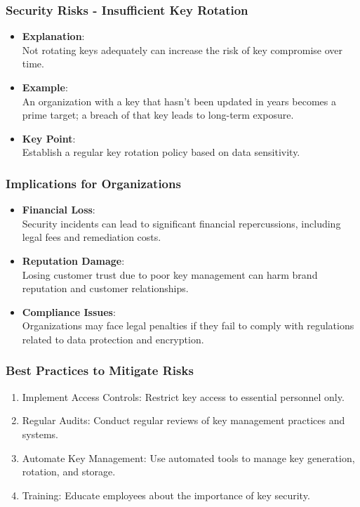 \documentclass{beamer}
\begin{document}
\begin{frame}[fragile]
    \frametitle{Security Risks - Insufficient Key Rotation}
    \begin{itemize}
        \item \textbf{Explanation}:
        \\ Not rotating keys adequately can increase the risk of key compromise over time.
        \item \textbf{Example}:
        \\ An organization with a key that hasn't been updated in years becomes a prime target; a breach of that key leads to long-term exposure.
        \item \textbf{Key Point}:
        \\ Establish a regular key rotation policy based on data sensitivity.
    \end{itemize}
\end{frame}

\begin{frame}[fragile]
    \frametitle{Implications for Organizations}
    \begin{itemize}
        \item \textbf{Financial Loss}:
        \\ Security incidents can lead to significant financial repercussions, including legal fees and remediation costs.
        \item \textbf{Reputation Damage}:
        \\ Losing customer trust due to poor key management can harm brand reputation and customer relationships.
        \item \textbf{Compliance Issues}:
        \\ Organizations may face legal penalties if they fail to comply with regulations related to data protection and encryption.
    \end{itemize}
\end{frame}

\begin{frame}[fragile]
    \frametitle{Best Practices to Mitigate Risks}
    \begin{enumerate}
        \item Implement Access Controls: Restrict key access to essential personnel only.
        \item Regular Audits: Conduct regular reviews of key management practices and systems.
        \item Automate Key Management: Use automated tools to manage key generation, rotation, and storage.
        \item Training: Educate employees about the importance of key security.
    \end{enumerate}
\end{frame}
\end{document}
